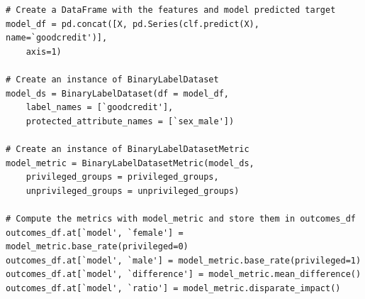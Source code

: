 \begin{lstlisting}[caption={Calculating independence metrics for the model using AIF360}, label=clt_AIF360metric1]
# Create a DataFrame with the features and model predicted target
model_df = pd.concat([X, pd.Series(clf.predict(X), name=`goodcredit')],
	axis=1)

# Create an instance of BinaryLabelDataset
model_ds = BinaryLabelDataset(df = model_df,
    label_names = [`goodcredit'],
    protected_attribute_names = [`sex_male'])

# Create an instance of BinaryLabelDatasetMetric
model_metric = BinaryLabelDatasetMetric(model_ds,
    privileged_groups = privileged_groups,
    unprivileged_groups = unprivileged_groups)

# Compute the metrics with model_metric and store them in outcomes_df
outcomes_df.at[`model', `female'] = model_metric.base_rate(privileged=0)
outcomes_df.at[`model', `male'] = model_metric.base_rate(privileged=1)
outcomes_df.at[`model', `difference'] = model_metric.mean_difference()
outcomes_df.at[`model', `ratio'] = model_metric.disparate_impact()
\end{lstlisting}

